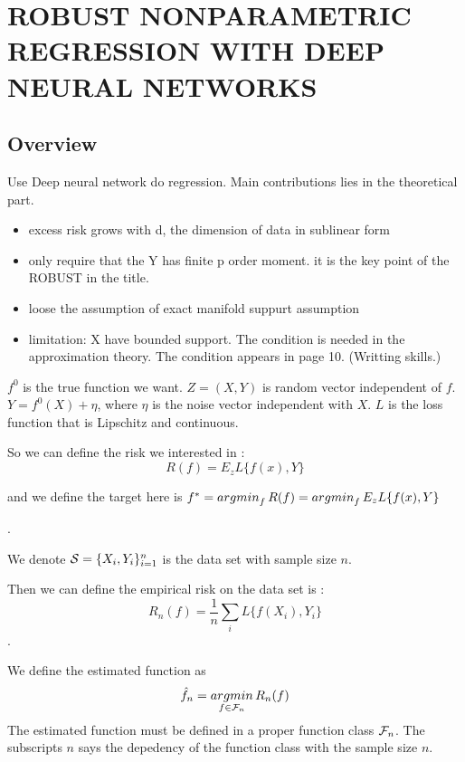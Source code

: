 
\chapter{ROBUST NONPARAMETRIC REGRESSION WITH DEEP NEURAL NETWORKS}
\section*{Overview}

Use Deep neural network do regression.
Main contributions lies in the theoretical part.
\begin{itemize}
  \item excess risk grows with d, the dimension of data in sublinear form
  \item only require that the Y has finite p order moment. it is the key point of the ROBUST in the title.
  \item loose the assumption of exact manifold suppurt assumption
  \item limitation: X have bounded support. The condition is needed in the approximation theory.
  The condition appears in page 10. (Writting skills.)
\end{itemize}

$f^0$ is the true function we want.
$Z= (X,Y)$ is random vector independent of $f$.  
$Y =  f^0(X) + \eta$, where $\eta$ is the noise vector independent with $X$.
$L$ is the loss function that is Lipschitz and continuous.


So we can define the risk we interested in :
$$
R(f) = E_z L\{f(x),Y\}
$$

and we define the target here is 
$f^* = \mathop{argmin}_f R(f) = \mathop{argmin}_f E_z L\{f(x),Y\}$

.

We denote $\mathcal{S} = \{X_i,Y_i\}_{i=1}^n$ is the data set with sample size $n$.

Then we can define the empirical risk on the data set is :
$$
R_n(f) = \frac{1}{n} \sum_i L\{f(X_i),Y_i\}
$$
.

We define the estimated function as
$$
\hat f_n = \mathop{argmin}\limits_{f\in \mathcal{F}_n} R_n(f)
$$
The estimated function must be defined in a proper function class $\mathcal{F}_n$. The subscripts $n$ says the depedency of the function class with the sample size $n$.

